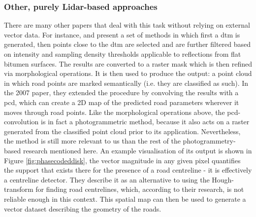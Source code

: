 \subsubsection{Other, purely Lidar-based approaches}

There are many other papers that deal with this task without relying on external vector data. For instance, \cite{clode_etal_2004} and \cite{clode_etal_2007} present a set of methods in which first a \ac{dtm} is generated, then points close to the \ac{dtm} are selected and are further filtered based on intensity and sampling density thresholds applicable to reflections from flat bitumen surfaces. The results are converted to a raster mask which is then refined via morphological operations. It is then used to produce the output: a point cloud in which road points are marked semantically (i.e. they are classified as such). In the 2007 paper, they extended the procedure by convolving the results with a \ac{pcd}, which can create a 2D map of the predicted road parameters wherever it moves through road points. Like the morphological operations above, the \ac{pcd}-convolution is in fact a photogrammetric method, because it also acts on a raster generated from the classified point cloud prior to its application. Nevertheless, the method is still more relevant to us than the rest of the photogrammetry-based research mentioned here. An example visualisation of its output is shown in Figure \ref{fig:phasecodeddisk}, the vector magnitude in any given pixel quantifies the support that exists there for the presence of a road centreline - it is effectively a centreline detector. They describe it as an alternative to using the Hough-transform for finding road centrelines, which, according to their research, is not reliable enough in this context. This spatial map can then be used to generate a vector dataset describing the geometry of the roads.

